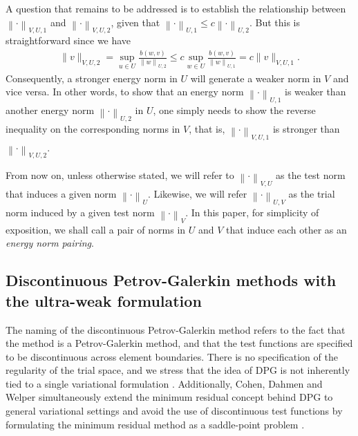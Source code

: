 \documentclass[11pt,onecolumn]{scrartcl}
\newcommand{\seclab}[1]{\label{sec:#1}}
\newcommand{\nor}[1]{\left\| #1 \right\|}
\begin{document}
A question that remains to be addressed is to establish the relationship
between $\nor{\cdot}_{V,U,1}$ and $\nor{\cdot}_{V,U,2}$, given that
$\nor{\cdot}_{U,1} \le c \nor{\cdot}_{U,2}$. But this is
straightforward since we have
\begin{align*}
 \| v \|_{V,U,2} = \sup_{u \in U} \frac{b\left(w,v\right)}{\left\|
  w \right\|_{U,2}} \le c\sup_{w \in U} \frac{b\left(w,v\right)}{\left\| w
  \right\|_{U,1}} = c\| v \|_{V,U,1}.
\end{align*}
Consequently, a stronger energy norm in $U$ will generate a weaker
norm in $V$ and vice versa. In other words, to show that an
energy norm $\nor{\cdot}_{U,1}$ is weaker than another energy norm
$\nor{\cdot}_{U,2}$ in $U$, one simply needs to show the reverse inequality on the
corresponding norms in $V$, that is, $\nor{\cdot}_{V,U,1}$ is stronger
than $\nor{\cdot}_{V,U,2}$.

From now on, unless otherwise stated, we will refer to $\nor{\cdot}_{V,U}$ as the test norm that induces a given norm $\nor{\cdot}_U$. Likewise, we will refer $\nor{\cdot}_{U,V}$ as the trial norm induced by a given test norm $\nor{\cdot}_V$. In this paper, for simplicity of exposition, we shall call a pair of norms in $U$ and $V$ that induce each other as an {\em energy norm pairing}.

\subsection{Discontinuous Petrov-Galerkin methods with the ultra-weak formulation}
\seclab{abstractUweak}

The naming of the discontinuous Petrov-Galerkin method refers to the fact that the method is a Petrov-Galerkin method, and that the test functions are specified to be discontinuous across element boundaries. There is no specification of the regularity of the trial space, and we stress that the idea of DPG is not inherently tied to a single variational formulation \cite{Bui-ThanhDemkowiczGhattas11a}. Additionally, Cohen, Dahmen and Welper simultaneously extend the minimum residual concept behind DPG to general variational settings and avoid the use of discontinuous test functions by formulating the minimum residual method as a saddle-point problem \cite{DahmenVariationalStabilization}.  
\end{document}
